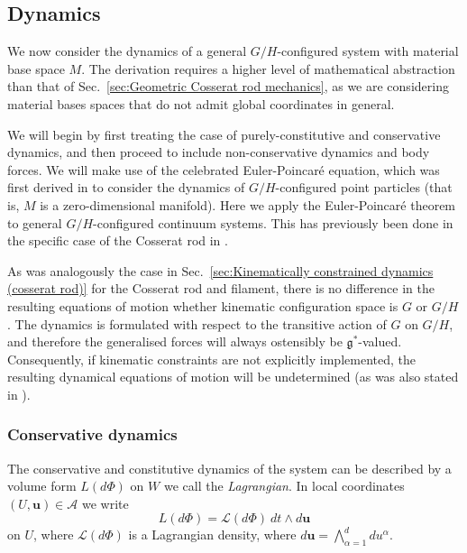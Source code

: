 \subsection{Dynamics} \label{sec:Geometric dynamics}

We now consider the dynamics of a general $G/H$-configured system with material base space $M$. The derivation requires a higher level of mathematical abstraction than that of Sec.~\ref{sec:Geometric Cosserat rod mechanics}, as we are considering material bases spaces that do not admit global coordinates in general.

We will begin by first treating the case of purely-constitutive and conservative dynamics, and then proceed to include non-conservative dynamics and body forces. We will make use of the celebrated Euler-Poincaré equation, which was first derived in \citep{marleHenriPoincareNote2013, poincareFormeNouvelleEquations1901} to consider the dynamics of $G/H$-configured point particles (that is, $M$ is a zero-dimensional manifold). Here we apply the Euler-Poincaré theorem to general $G/H$-configured continuum systems. This has previously been done in the specific case of the Cosserat rod in \citep{giusteriSimulationViscoelasticCosserat2021}.

As was analogously the case in Sec.~\ref{sec:Kinematically constrained dynamics (cosserat rod)} for the Cosserat rod and filament, there is no difference in the resulting equations of motion whether kinematic configuration space is $G$ or $G/H$. The dynamics is formulated with respect to the transitive action of $G$ on $G/H$, and therefore the generalised forces will always ostensibly be $\mathfrak{g}^*$-valued. Consequently, if kinematic constraints are not explicitly implemented, the resulting dynamical equations of motion will be undetermined (as was also stated in \citep{marleHenriPoincareNote2013, poincareFormeNouvelleEquations1901}).

\subsubsection*{Conservative dynamics}

The conservative and constitutive dynamics of the system can be described by a volume form $L(d\Phi)$ on $W$ we call the \textit{Lagrangian}. In local coordinates $(U, \mathbf{u}) \in \mathcal{A}$ we write
\begin{equation} \label{eq:L volume form}
L(d \Phi) = \mathcal{L}(d \Phi)\ dt \wedge d \mathbf{u}
\end{equation}
on $U$, where $\mathcal{L}(d \Phi)$ is a Lagrangian density, where  $d \mathbf{u} = \bigwedge_{\alpha = 1}^d d u^\alpha$.

